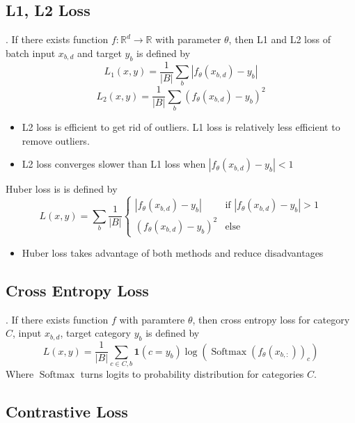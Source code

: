 \documentclass[8pt]{beamer}
\newcommand{\mbb}[1]{\mathbb{#1}}
\newcommand{\mb}[1]{\mathbf{#1}}
\newcommand{\abs}[1]{\left\lvert #1 \right\rvert}
\begin{document}
\subsection{L1, L2 Loss}

\begin{frame}{.}
    If there exists function $f: \mbb{R}^d \to \mbb{R}$ with parameter $\theta$, then L1 and L2 loss of batch input $x_{b,d}$ and target $y_{b}$ is defined by
    \[
    L_1(x,y) = \frac{1}{\abs{B}}\sum_{b}\abs{f_\theta(x_{b,d}) - y_{b}}
    \]
    \[
    L_2(x,y) = \frac{1}{\abs{B}}\sum_{b} (f_\theta(x_{b,d}) - y_{b})^2
    \]

    \begin{itemize}
        \item L2 loss is efficient to get rid of outliers. L1 loss is relatively less efficient to remove outliers.
        \item L2 loss converges slower than L1 loss when $\abs{f_\theta(x_{b,d}) - y_b} < 1$
    \end{itemize}

    Huber loss is is defined by
    \[
        L(x,y)=\sum_b \frac{1}{\abs{B}}\begin{cases}
            \abs{f_\theta(x_{b,d}) - y_b} & \text{if } \abs{f_\theta(x_{b,d}) - y_b} > 1 \\
            (f_\theta(x_{b,d}) - y_b)^2 & \text{else} 
        \end{cases}
    \]
    \begin{itemize}
        \item Huber loss takes advantage of both methods and reduce disadvantages
    \end{itemize}
\end{frame}

\subsection{Cross Entropy Loss}

\begin{frame}{.}
    If there exists function $f$ with paramtere $\theta$, then cross entropy loss for category $C$, input $x_{b,d}$, target category $y_{b}$ is defined by
    \[
        L(x,y) = \frac{1}{\abs{B}} \sum_{c \in C, b} \mb{1}(c = y_b) \log{( \operatorname{Softmax}(f_\theta(x_{b, :}))_{c})}
    \]
    Where $\operatorname{Softmax}$ turns logits to probability distribution for categories $C$.
\end{frame}

\subsection{Contrastive Loss}
\end{document}
